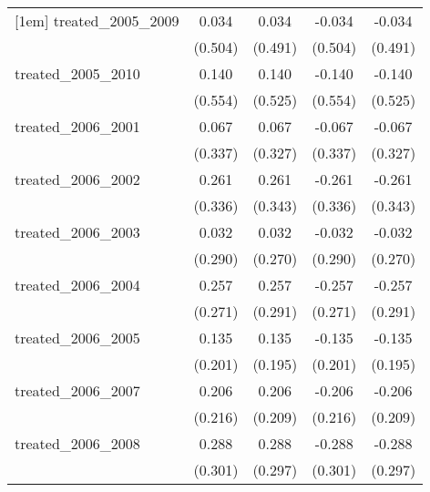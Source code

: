 {\begin{tabular}{l*{4}{c}}
[1em]
treated\_2005\_2009&       0.034         &       0.034         &      -0.034         &      -0.034         \\
            &     (0.504)         &     (0.491)         &     (0.504)         &     (0.491)         \\
[1em]
treated\_2005\_2010&       0.140         &       0.140         &      -0.140         &      -0.140         \\
            &     (0.554)         &     (0.525)         &     (0.554)         &     (0.525)         \\
[1em]
treated\_2006\_2001&       0.067         &       0.067         &      -0.067         &      -0.067         \\
            &     (0.337)         &     (0.327)         &     (0.337)         &     (0.327)         \\
[1em]
treated\_2006\_2002&       0.261         &       0.261         &      -0.261         &      -0.261         \\
            &     (0.336)         &     (0.343)         &     (0.336)         &     (0.343)         \\
[1em]
treated\_2006\_2003&       0.032         &       0.032         &      -0.032         &      -0.032         \\
            &     (0.290)         &     (0.270)         &     (0.290)         &     (0.270)         \\
[1em]
treated\_2006\_2004&       0.257         &       0.257         &      -0.257         &      -0.257         \\
            &     (0.271)         &     (0.291)         &     (0.271)         &     (0.291)         \\
[1em]
treated\_2006\_2005&       0.135         &       0.135         &      -0.135         &      -0.135         \\
            &     (0.201)         &     (0.195)         &     (0.201)         &     (0.195)         \\
[1em]
treated\_2006\_2007&       0.206         &       0.206         &      -0.206         &      -0.206         \\
            &     (0.216)         &     (0.209)         &     (0.216)         &     (0.209)         \\
[1em]
treated\_2006\_2008&       0.288         &       0.288         &      -0.288         &      -0.288         \\
            &     (0.301)         &     (0.297)         &     (0.301)         &     (0.297)         \\

\end{tabular}}
